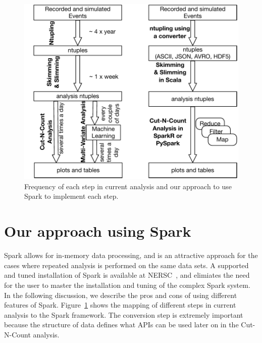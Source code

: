 \documentclass[11pt, twocolumn]{article}
\newcommand{\squeezeup}{\vspace{-5.5mm}}
\begin{document}
\squeezeup
\begin{figure}[htbp]
\begin{center}
 \includegraphics[scale=0.5]{flow}
\caption{Frequency of each step in current analysis and our approach to 
use Spark to implement each step. }
\label{fig:flow}
\end{center}
\end{figure}
\squeezeup

%

\section{Our approach using Spark}
\squeezeup
Spark allows for in-memory data processing, and is an attractive
approach for the cases where repeated analysis is performed on the
same data sets. A supported and tuned installation of Spark is
available at NERSC~\cite{nersc-spark}, and elimiates the need for 
the user to master the installation and tuning of the complex Spark system.
In the following discussion, we describe the pros and cons of using 
different features of Spark. Figure~\ref{fig:flow} shows the mapping of 
different steps in current analysis to the Spark framework. The conversion 
step is extremely important because the structure of data defines 
what APIs can be used later on in the Cut-N-Count analysis. 
\end{document}
